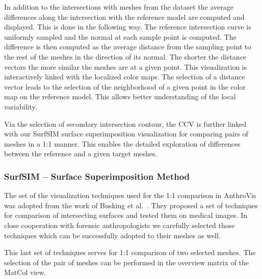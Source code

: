 \documentclass[final,5p,times]{elsarticle}
\begin{document}
In addition to the intersections with meshes from the dataset the average differences along the intersection with the reference model are computed and displayed.
This is done in the following way.
The reference intersection curve is uniformly sampled and the normal at each sample point is computed.
The difference is then computed as the average distance from the sampling point to the rest of the meshes in the direction of its normal.
The shorter the distance vectors the more similar the meshes are at a given point.
This visualization is interactively linked with the localized color maps.
The selection of a distance vector leads to the selection of the neighborhood of a given point in the color map on the reference model.
This allows better understanding of the local variability.

Via the selection of secondary intersection contour, the CCV is further linked with our SurfSIM surface superimposition visualization for comparing pairs of meshes in a 1:1 manner. 
This enables the detailed exploration of differences between the reference and a given target meshes. 

\subsubsection{SurfSIM -- Surface Superimposition Method}
The set of the visualization techniques used for the 1:1 comparison in AnthroVis was adopted from the work of Busking et al.~\cite{busking2011image}.
They proposed a set of techniques for comparison of intersecting surfaces and tested them on medical images.
In close cooperation with forensic anthropologists we carefully selected those techniques which can be successfully adopted to their meshes as well.

This last set of techniques serves for 1:1 comparison of two selected meshes.
The selection of the pair of meshes can be performed in the overview matrix of the MatCol view.
\end{document}
